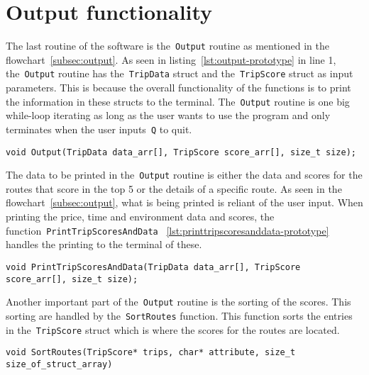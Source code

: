 \section{Output functionality}\label{sec:output-functionality}

The last routine of the software is the~\texttt{Output} routine as mentioned in the flowchart~\ref{subsec:output}.
As seen in listing~\ref{lst:output-prototype} in line 1, the~\texttt{Output} routine has the~\texttt{TripData} struct
and the~\texttt{TripScore} struct as input parameters.
This is because the overall functionality of the functions is to print the information in these structs to the terminal.
The~\texttt{Output} routine is one big while-loop iterating as long as the user wants to use the program and only
terminates when the user inputs~\texttt{Q} to quit.

\begin{lstlisting}[caption={Function prototype for~\texttt{Output}}, label={lst:output-prototype}, captionpos=b]
void Output(TripData data_arr[], TripScore score_arr[], size_t size);
\end{lstlisting}

The data to be printed in the~\texttt{Output} routine is either the data and scores for the routes that score in the top
5 or the details of a specific route.
As seen in the flowchart~\ref{subsec:output}, what is being printed is reliant of the user input.
When printing the price, time and environment data and scores, the function~\texttt{PrintTripScoresAndData}
~\ref{lst:printtripscoresanddata-prototype} handles the printing to the terminal of these.

\begin{lstlisting}[caption={Function prototype for~\texttt{PrintTripScoresAndData}},
    label={lst:printtripscoresanddata-prototype}, captionpos=b]
void PrintTripScoresAndData(TripData data_arr[], TripScore score_arr[], size_t size);
\end{lstlisting}


Another important part of the~\texttt{Output} routine is the sorting of the scores.
This sorting are handled by the~\texttt{SortRoutes} function.
This function sorts the entries in the~\texttt{TripScore} struct which is where the scores for the routes are located.


\begin{lstlisting}[caption={Function prototype for~\texttt{SortRoutes}}, label={lst:sortroutes-prototype},
    captionpos=b]
void SortRoutes(TripScore* trips, char* attribute, size_t size_of_struct_array)
\end{lstlisting}
